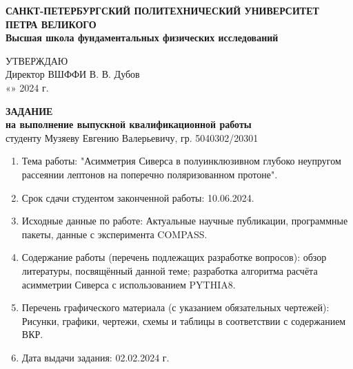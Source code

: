 \thispagestyle{empty}
\begin{spacing}{1}


\begin{center}
   \textbf{САНКТ-ПЕТЕРБУРГСКИЙ ПОЛИТЕХНИЧЕСКИЙ УНИВЕРСИТЕТ ПЕТРА ВЕЛИКОГО}\\
   \textbf{Высшая школа фундаментальных физических исследований}\\
\end{center}

\hfill \break

\begin{minipage}{0.6\textwidth}
\end{minipage}
\hfill
\begin{minipage}{0.39\textwidth}
   \flushleft
   УТВЕРЖДАЮ\\
   Директор ВШФФИ
   \underline{\hspace{2.6cm}} \hspace{0.1cm} В. В. Дубов\\
   «\underline{\hspace{0.7cm}}» \hspace{0.05cm} \underline{\hspace{2.4cm}} 2024 г.\\
\end{minipage}

\hfill \break

\begin{center}
   \textbf{ЗАДАНИЕ} \\
   \textbf{на выполнение выпускной квалификационной работы} \\
   \normalsize{студенту Музяеву Евгению Валерьевичу, гр. 5040302/20301}
\end{center}

\begin{enumerate}
   \item Тема работы: "Асимметрия Сиверса в полуинклюзивном глубоко неупругом рассеянии лептонов на поперечно поляризованном протоне".
   \item Срок сдачи студентом законченной работы: 10.06.2024.
   \item Исходные данные по работе: Актуальные научные публикации, программные пакеты, данные с эксперимента COMPASS.
   \item Содержание работы (перечень подлежащих разработке вопросов): обзор литературы, посвящённый данной теме; разработка алгоритма расчёта асимметрии Сиверса с использованием PYTHIA8.
   \item Перечень графического материала (с указанием обязательных чертежей): Рисунки, графики, чертежи, схемы и таблицы в соответствии с содержанием ВКР.
   \item Дата выдачи задания: 02.02.2024 г.
\end{enumerate}


\end{spacing}
